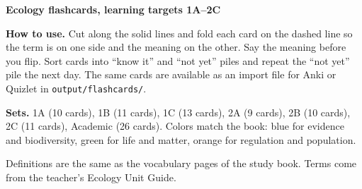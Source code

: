 \documentclass[11pt,letterpaper]{article}
\begin{document}
\thispagestyle{fancy}
{\Large\bfseries Ecology flashcards, learning targets 1A--2C\par}
\medskip
\textbf{How to use.} Cut along the solid lines and fold each card on the dashed line so the term is on one side and the meaning on the other. Say the meaning before you flip. Sort cards into ``know it'' and ``not yet'' piles and repeat the ``not yet'' pile the next day. The same cards are available as an import file for Anki or Quizlet in \texttt{output/flashcards/}.\par
\medskip
\textbf{Sets.} 1A (10 cards), 1B (11 cards), 1C (13 cards), 2A (9 cards), 2B (10 cards), 2C (11 cards), Academic (26 cards). Colors match the book: blue for evidence and biodiversity, green for life and matter, orange for regulation and population.\par
\medskip
Definitions are the same as the vocabulary pages of the study book. Terms come from the teacher's Ecology Unit Guide.
\clearpage
\end{document}
